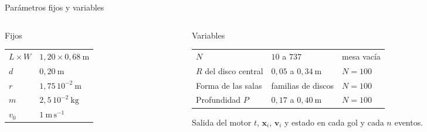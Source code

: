 \documentclass[aspectratio=169,11pt]{beamer}
\begin{document}
\begin{frame}{Parámetros fijos y variables}
  \begin{columns}[T,onlytextwidth]
    \begin{column}{0.40\textwidth}
      \begin{block}{Fijos}
        {\small
        \begin{tabular}{@{}ll@{}}
          $L\times W$ & $1{,}20\times0{,}68\ \mathrm{m}$ \\
          $d$ & $0{,}20\ \mathrm{m}$ \\
          $r$ & $1{,}75\,10^{-2}\ \mathrm{m}$ \\
          $m$ & $2{,}5\,10^{-2}\ \mathrm{kg}$ \\
          $v_0$ & $1\ \mathrm{m\,s^{-1}}$ \\
        \end{tabular}}
      \end{block}
    \end{column}
    \begin{column}{0.56\textwidth}
      \begin{block}{Variables}
        {\small
        \begin{tabular}{@{}lll@{}}
          $N$ & $10$ a $737$ & mesa vacía \\
          $R$ del disco central & $0{,}05$ a $0{,}34\ \mathrm{m}$ & $N=100$ \\
          Forma de las salas & familias de discos & $N=100$ \\
          Profundidad $P$ & $0{,}17$ a $0{,}40\ \mathrm{m}$ & $N=100$ \\
        \end{tabular}}
      \end{block}
      \begin{block}{Salida del motor}
        $t$, $\bm{x}_i$, $\bm{v}_i$ y estado en cada gol y cada $n$ eventos.
      \end{block}
    \end{column}
  \end{columns}
\end{frame}
\end{document}

